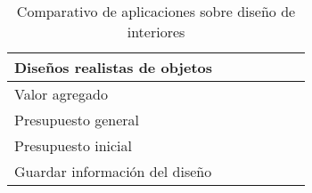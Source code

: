 \begin{table}[]
{\begin{tabular}{|l|l|l|l|l|l|l|}
			Diseños realistas de objetos   &                                                 &                          & \cellcolor[HTML]{BFBFBF} & \cellcolor[HTML]{BFBFBF} & \cellcolor[HTML]{FFFFFF} & \cellcolor[HTML]{BFBFBF} \\ \hline
			Valor agregado                 &                                                 &                          & \cellcolor[HTML]{BFBFBF} & \cellcolor[HTML]{BFBFBF} & \cellcolor[HTML]{FFFFFF} & \cellcolor[HTML]{BFBFBF} \\ \hline
			Presupuesto general            &                                                 &                          &                          &                          &                          & \cellcolor[HTML]{BFBFBF} \\ \hline
			Presupuesto inicial            &                                                 &                          &                          &                          &                          & \cellcolor[HTML]{BFBFBF} \\ \hline
			Guardar información del diseño &                                                 &                          &                          &                          &                          & \cellcolor[HTML]{BFBFBF} \\ \hline
		\end{tabular}%
	}
	\caption{Comparativo de aplicaciones sobre diseño de interiores}
	\label{my-label}
\end{table}